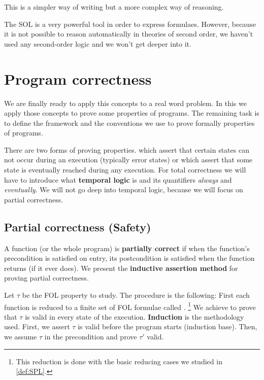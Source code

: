 This is a simpler way of writing but a more complex way of reasoning.

The \gls{SOL} is a very powerful tool in order to express formulaes. 
%
However, because it is not possible to reason automatically in theories of second order, we haven't used any second-order logic and we won't get deeper into it. 



\section{Program correctness}

We are finally ready to apply this concepts to a real word problem. In this \thisworkm we apply those concepts to prove some properties of programs.
%
The remaining task is to define the framework and the conventions we use to prove formally properties of programs.

There are two forms of proving properties. 
%
 which assert that certain states can not occur during an execution (typically error states) or 
 which assert that some state is eventually reached during any execution. 
%
For total correctness we will have to introduce what \textbf{temporal logic} is and its quantifiers \textit{always} and \textit{eventually}. 
%
We will not go deep into temporal logic, because we will focus on partial correctness.




\label{def:SPL}


\subsection{Partial correctness (Safety)}

A function (or the whole program) is \textbf{partially correct} if when the function's precondition is satisfied on entry, its postcondition is satisfied when the function returns (if it ever does).
%
We present the \textbf{inductive assertion method} for proving partial correctness.


Let $\tau$ be the \gls{FOL} property to study. 
%
The procedure is the following:
%
First each function is reduced to a finite set of \gls{FOL} formulae called .
%
\footnote{This reduction is done with the basic reducing cases we studied in \ref{def:SPL}.}
%
We achieve to prove that $\tau$ is valid in every state of the execution.
%
\textbf{Induction} is the methodology used.
%
First, we assert $\tau$ is valid before the program starts (induction base).
%
Then, we assume $\tau$ in the precondition and prove $\tau'$ valid.




